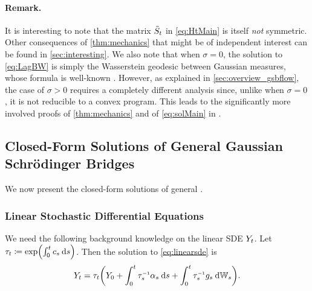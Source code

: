 \paragraph{Remark.}
It is interesting to note that the matrix $\tilde{S}_{t}$ in \eqref{eq:HtMain} is itself \emph{not} symmetric. Other consequences of \cref{thm:mechanics} that might be of independent interest can be found in \cref{sec:interesting}. We also note that when $\sigma = 0$, the solution to \eqref{eq:LagBW} is simply the Wasserstein geodesic between Gaussian measures, whose formula is well-known \citep{dowson1982frechet, takatsu2010wasserstein}. However, as explained in \cref{sec:overview_gsbflow}, the case of $\sigma > 0$ requires a completely different analysis since, unlike when $\sigma = 0$, it is not reducible to a convex program. This leads to the significantly more involved proofs of \cref{thm:mechanics} and of \eqref{eq:solMain} in \citet{mallasto2021entropy}.

\subsection{Closed-Form Solutions of General Gaussian Schr{\"o}dinger Bridges}
\label{sec:results_gsbflow}

We now present the closed-form solutions of general .

\subsubsection{Linear Stochastic Differential Equations}
\label{sec:linearsdes}

We need the following background knowledge on the linear \acrshort{SDE} $Y_{ t }$. Let $\aggtime \defeq \exp\parens*{  \int_0^\ctime \drift[\ctimealt] \dd \ctimealt}$. Then the solution to \eqref{eq:linearsde} is \citep{platen2010numerical}
\begin{align}
\label{eq:linearsdesol}
\refsde = \aggtime  \parens*{\refsde[0] +  \int_0^\ctime  \aggtimeinv[\ctimealt]\shift[\ctimealt]  \dd \ctimealt + \int_0^\ctime {\aggtimeinv[\ctimealt]}{ \volat[\ctimealt] } \dWiener }.
\end{align}

